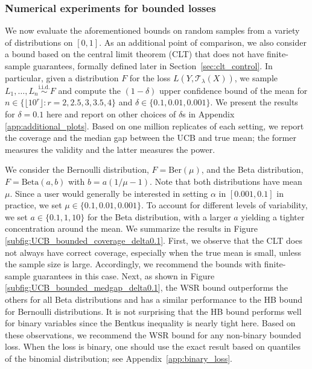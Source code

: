 \documentclass[10pt]{article}
\newcommand{\T}{\mathcal{T}}
\begin{document}
\subsubsection{Numerical experiments for bounded losses}
We now evaluate the aforementioned bounds on random samples from a variety of distributions on $[0,1]$. As an additional point of comparison, we also consider a bound based on the central limit theorem (CLT) that does not have finite-sample guarantees, formally defined later in Section~\ref{sec:clt_control}. In particular, given a distribution $F$ for the loss $L(Y, \T_\lambda(X))$, we sample $L_1, \ldots, L_n\stackrel{\mathrm{i.i.d.}}{\sim} F$ and compute the $(1 - \delta)$ upper confidence bound of the mean for $n\in \{\lfloor 10^r\rfloor: r = 2, 2.5, 3, 3.5, 4\}$ and $\delta \in \{0.1, 0.01, 0.001\}$.  We present the results for $\delta = 0.1$ here and report on other choices of $\delta$s in Appendix \ref{app:additional_plots}. 
Based on one million replicates of each setting, we report the coverage and the median gap between the UCB and true mean; the former measures the validity and the latter measures the power.

We consider the Bernoulli distribution, $F = \mathrm{Ber}(\mu)$, and the Beta distribution, $F = \mathrm{Beta}(a, b)$ with $b = a(1/\mu - 1)$. Note that both distributions have mean $\mu$. Since a user would generally be interested in setting $\alpha$ in $[0.001, 0.1]$ in practice, we set $\mu \in \{0.1, 0.01, 0.001\}$. To account for different levels of variability, we set $a\in \{0.1, 1, 10\}$ for the Beta distribution, with a larger $a$ yielding a tighter concentration around the mean. 
We summarize the results in Figure \ref{subfig:UCB_bounded_coverage_delta0.1}. First, we observe that the CLT does not always have correct coverage, especially when the true mean is small, unless the sample size is large. Accordingly, we recommend the bounds with finite-sample guarantees in this case. Next, as shown in Figure \ref{subfig:UCB_bounded_medgap_delta0.1}, the WSR bound outperforms the others for all Beta distributions and has a similar performance to the HB bound for Bernoulli distributions. It is not surprising that the HB bound performs well for binary variables since the Bentkus inequality is nearly tight here. 
Based on these observations, we recommend the WSR bound for any non-binary bounded loss. When the loss is binary, one should use the exact result based on quantiles of the binomial distribution; see Appendix~\ref{app:binary_loss}.
\end{document}
